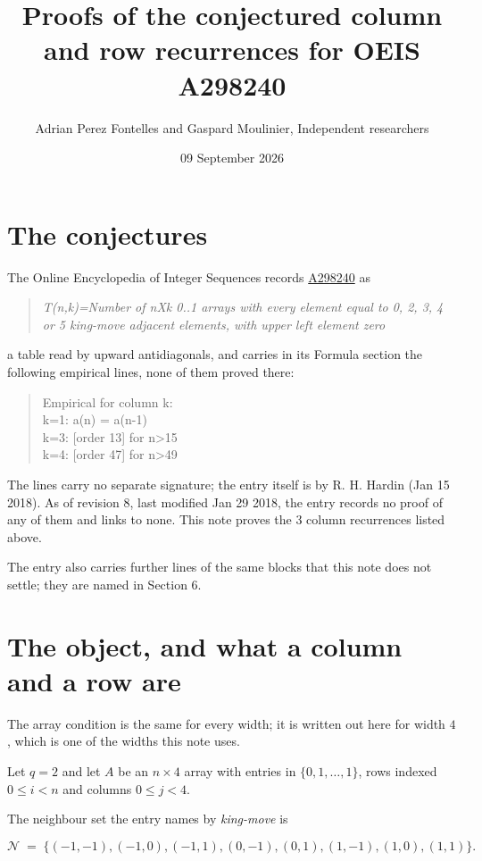 \documentclass[11pt]{article}
\title{Proofs of the conjectured column and row recurrences for OEIS A298240}
\author{Adrian Perez Fontelles and Gaspard Moulinier, Independent researchers}
\date{09 September 2026}
\theoremstyle{definition}
\begin{document}
\maketitle
\section{The conjectures}

The Online Encyclopedia of Integer Sequences records \href{https://oeis.org/A298240}{A298240} as

\begin{quote}\itshape T(n,k)=Number of nXk 0..1 arrays with every element equal to 0, 2, 3, 4 or 5 king-move adjacent elements, with upper left element zero\end{quote}

a table read by upward antidiagonals, and carries in its Formula section the following empirical lines, none of them proved there:

\begin{quote}\ttfamily Empirical for column k:\\
k=1: a(n) = a(n-1)\\k=3: [order 13] for n>15\\k=4: [order 47] for n>49\end{quote}

The lines carry no separate signature; the entry itself is by R. H. Hardin (Jan 15 2018). As of revision 8, last modified Jan 29 2018, the entry records no proof of any of them and links to none. This note proves the 3 column recurrences listed above.

The entry also carries further lines of the same blocks that this note does not settle; they are named in Section 6.

\section{The object, and what a column and a row are}

The array condition is the same for every width; it is written out here for width $4$, which is one of the widths this note uses.

Let $q = 2$ and let $A$ be an $n \times 4$ array with entries in $\{0,1,\dots,1\}$, rows indexed $0 \le i < n$ and columns $0 \le j < 4$.

The neighbour set the entry names by {\itshape king-move} is

\[\mathcal{N} \;=\; \{(-1,-1), (-1,0), (-1,1), (0,-1), (0,1), (1,-1), (1,0), (1,1)\}.\]
\end{document}
